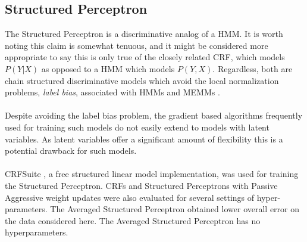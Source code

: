 \documentclass[12pt]{report}
\newcommand{\1}[0]{\mathbbm{1}}
\begin{document}
\subsection{Structured Perceptron}
The Structured Perceptron is a discriminative analog of a \ac{HMM}.
It is worth noting this claim is somewhat tenuous, and it might
be considered more appropriate to say this is only true of the closely
related \ac{CRF}, which models $P(Y|X)$ as opposed to a \ac{HMM}
which models $P(Y,X)$. Regardless, both are chain structured discriminative
models which avoid the local normalization problems, \emph{label bias}, associated
with \acp{HMM} and \acp{MEMM} \cite{lafferty-crf}.
\\\\
Despite avoiding the label bias problem, the gradient based algorithms frequently
used for training such models do not easily extend to models with latent variables.
As latent variables offer a significant amount of flexibility this is a potential
drawback for such models.
\\\\
CRFSuite \cite{CRFsuite}, a free structured linear model implementation, was used
for training the Structured Perceptron. \acp{CRF} and Structured Perceptrons
with Passive Aggressive weight updates were also evaluated for several settings of
hyper-parameters. The Averaged Structured Perceptron obtained lower overall
error on the data considered here. The Averaged Structured Perceptron has no hyperparameters.
\end{document}
